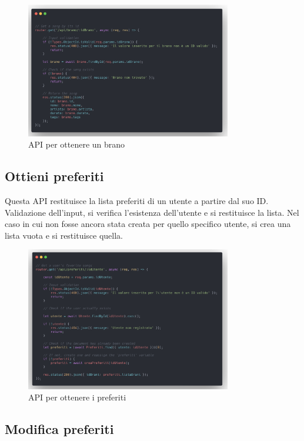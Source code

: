 \documentclass[a4paper,12pt]{article}
\begin{document}
\begin{figure}[htp]
    \centering
    \includegraphics[width=0.8\textwidth]{source-code/api-ottieni-brano.png}
    \caption{API per ottenere un brano}
\end{figure}

\subsection{Ottieni preferiti}

Questa API restituisce la lista preferiti di un utente a partire dal suo ID. Validazione dell'input, si verifica l'esistenza dell'utente e si restituisce la lista. Nel caso in cui non fosse ancora stata creata per quello specifico utente, si crea una lista vuota e si restituisce quella.

\begin{figure}[htp]
    \centering
    \includegraphics[width=0.8\textwidth]{source-code/api-ottieni-preferiti.png}
    \caption{API per ottenere i preferiti}
\end{figure}

\subsection{Modifica preferiti}
\end{document}
